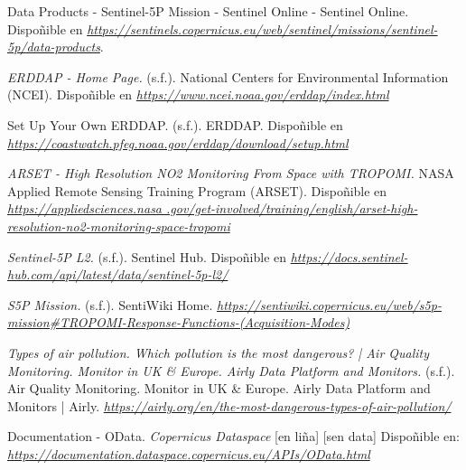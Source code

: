 

\begin{thebibliography}{99}
 Data Products - Sentinel-5P Mission - Sentinel Online - Sentinel Online. Dispoñible en \textit{\url{ https://sentinels.copernicus.eu/web/sentinel/missions/sentinel-5p/data-products}}.

 \textit{ERDDAP - Home Page.} (s.f.). National Centers for Environmental Information (NCEI). Dispoñible en \textit{\url{ https://www.ncei.noaa.gov/erddap/index.html}}

 Set Up Your Own ERDDAP. (s.f.). ERDDAP. Dispoñible en \textit{\url{ https://coastwatch.pfeg.noaa.gov/erddap/download/setup.html}}

 \textit{ARSET - High Resolution NO2 Monitoring From Space with TROPOMI.} NASA Applied Remote Sensing Training Program (ARSET). Dispoñible en \textit{\url{ https://appliedsciences.nasa
.gov/get-involved/training/english/arset-high-resolution-no2-monitoring-space-tropomi}}

 \textit{Sentinel-5P L2.} (s.f.). Sentinel Hub. Dispoñible en \textit{\url{ https://docs.sentinel-hub.com/api/latest/data/sentinel-5p-l2/}}

 \textit{S5P Mission.} (s.f.). SentiWiki Home. \textit{\url{https://sentiwiki.copernicus.eu/web/s5p-mission#TROPOMI-Response-Functions-(Acquisition-Modes)}}

 \textit{Types of air pollution. Which pollution is the most dangerous? | Air Quality Monitoring. Monitor in UK \& Europe. Airly Data Platform and Monitors.} (s.f.). Air Quality
Monitoring. Monitor in UK \& Europe. Airly Data Platform and Monitors | Airly. \textit{\url{https://airly.org/en/the-most-dangerous-types-of-air-pollution/}}

 Documentation - OData. \textit{Copernicus Dataspace} [en liña] [sen data] Dispoñible en: \textit{\url{https://documentation.dataspace.copernicus.eu/APIs/OData.html}}






\end{thebibliography}

